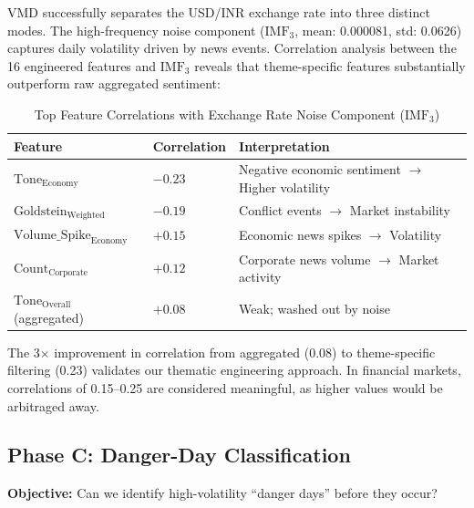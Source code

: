 \documentclass[11pt]{article}
\begin{document}
VMD successfully separates the USD/INR exchange rate into three distinct modes. The high-frequency noise component ($\text{IMF}_3$, mean: 0.000081, std: 0.0626) captures daily volatility driven by news events. Correlation analysis between the 16 engineered features and $\text{IMF}_3$ reveals that theme-specific features substantially outperform raw aggregated sentiment:

\begin{table}[t]
\centering
\small
\caption{Top Feature Correlations with Exchange Rate Noise Component ($\text{IMF}_3$)}
\label{tab:correlations}
\begin{tabular}{lll}
\toprule
\textbf{Feature} & \textbf{Correlation} & \textbf{Interpretation} \\
\midrule
$\text{Tone}_\text{Economy}$ & $-0.23$ & Negative economic sentiment $\rightarrow$ Higher volatility \\
$\text{Goldstein}_\text{Weighted}$ & $-0.19$ & Conflict events $\rightarrow$ Market instability \\
$\text{Volume\_Spike}_\text{Economy}$ & $+0.15$ & Economic news spikes $\rightarrow$ Volatility \\
$\text{Count}_\text{Corporate}$ & $+0.12$ & Corporate news volume $\rightarrow$ Market activity \\
$\text{Tone}_\text{Overall}$ (aggregated) & $+0.08$ & Weak; washed out by noise \\
\bottomrule
\end{tabular}
\end{table}

The 3$\times$ improvement in correlation from aggregated (0.08) to theme-specific filtering (0.23) validates our thematic engineering approach. In financial markets, correlations of 0.15--0.25 are considered meaningful, as higher values would be arbitraged away.

\subsection{Phase C: Danger-Day Classification}

\textbf{Objective:} Can we identify high-volatility ``danger days'' before they occur?
\end{document}
